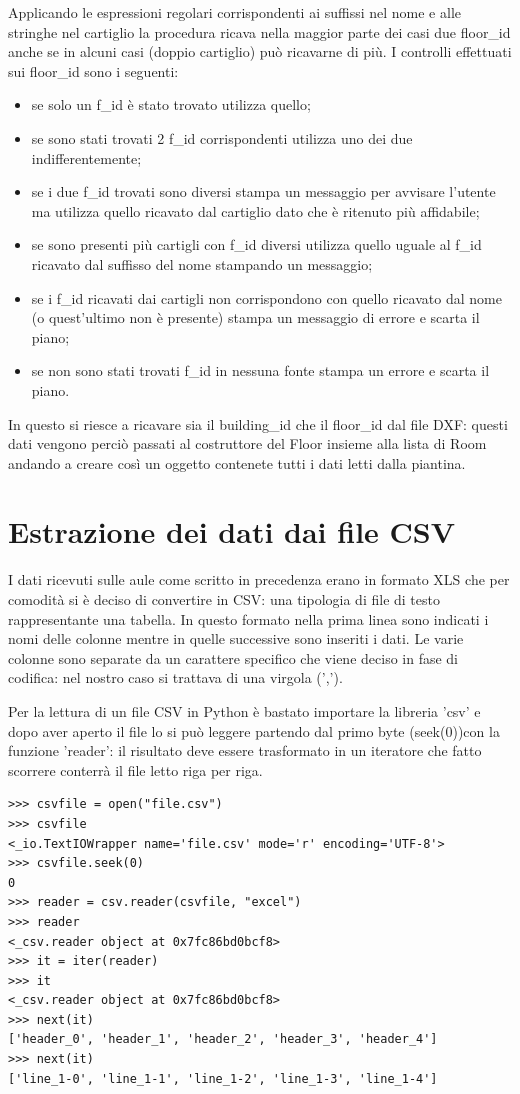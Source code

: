 \documentclass[12pt]{report}
\begin{document}
Applicando le espressioni regolari corrispondenti ai suffissi nel nome e alle stringhe nel cartiglio la procedura ricava nella maggior parte dei casi due floor\_id anche se in alcuni casi (doppio cartiglio) può ricavarne di più. 
I controlli effettuati sui floor\_id sono i seguenti:
\begin{itemize}
\item se solo un f\_id è stato trovato utilizza quello;
\item se sono stati trovati 2 f\_id corrispondenti utilizza uno dei due indifferentemente;
\item se i due f\_id trovati sono diversi stampa un messaggio per avvisare l'utente ma utilizza quello ricavato dal cartiglio dato che è ritenuto più affidabile;
\item se sono presenti più cartigli con f\_id diversi utilizza quello uguale al f\_id ricavato dal suffisso del nome stampando un messaggio;
\item se i f\_id ricavati dai cartigli non corrispondono con quello ricavato dal nome (o quest'ultimo non  è presente) stampa un messaggio di errore e scarta il piano;
\item se non sono stati trovati f\_id in nessuna fonte stampa un errore e scarta il piano.  
\end{itemize}

In questo si riesce a ricavare sia il building\_id che il floor\_id dal file DXF: questi dati vengono perciò passati al costruttore del Floor insieme alla lista di Room andando a creare così un oggetto contenete tutti i dati letti dalla piantina.

\newpage
\section{Estrazione dei dati dai file CSV}

I dati ricevuti sulle aule come scritto in precedenza erano in formato XLS che per comodità si è deciso di convertire in CSV: una tipologia di file di testo rappresentante una tabella.
In questo formato nella prima linea sono indicati i nomi delle colonne mentre in quelle successive sono inseriti i dati. Le varie colonne sono separate da un carattere specifico che viene deciso in fase di codifica: nel nostro caso si trattava di una virgola (',').

Per la lettura di un file CSV in Python è bastato importare la libreria 'csv' e dopo aver aperto il file lo si può leggere partendo dal primo byte (seek(0))con la funzione 'reader': il risultato deve essere trasformato in un iteratore che fatto scorrere conterrà il file letto riga per riga.
\begin{lstlisting}[label=codice,caption=Lettura di un file CSV, frame=single]
>>> csvfile = open("file.csv")
>>> csvfile
<_io.TextIOWrapper name='file.csv' mode='r' encoding='UTF-8'>
>>> csvfile.seek(0)
0
>>> reader = csv.reader(csvfile, "excel")
>>> reader
<_csv.reader object at 0x7fc86bd0bcf8>
>>> it = iter(reader)
>>> it
<_csv.reader object at 0x7fc86bd0bcf8>
>>> next(it)
['header_0', 'header_1', 'header_2', 'header_3', 'header_4']
>>> next(it)
['line_1-0', 'line_1-1', 'line_1-2', 'line_1-3', 'line_1-4']
\end{lstlisting}
\end{document}

